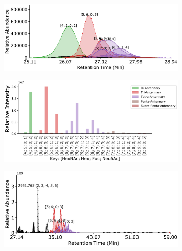     \begin{figure}[htb]
        \centering
        \begin{minipage}{1\linewidth}
            \centering
            \begin{subfigure}[b]{0.49\linewidth}
                \includegraphics[width=1\linewidth, valign=t]{figure/native_agp_chromatograms.eps}
                \subcaption{
                    \label{fig:agp_assignment:a}
                }
            \end{subfigure}
            \vspace{0pt}
            \begin{subfigure}[b]{0.49\linewidth}
                \includegraphics[width=1\linewidth, valign=b]{figure/native_agp_abundances.eps}
                \subcaption{
                    \label{fig:agp_assignment:b}
                }
            \end{subfigure}
        \end{minipage}
        \begin{minipage}{1\linewidth}
            \centering
            \begin{subfigure}[b]{0.49\linewidth}
                \includegraphics[width=1\linewidth, valign=t]{figure/dp_agp_chromatograms.eps}

\end{subfigure}
\end{minipage}
\end{figure}
